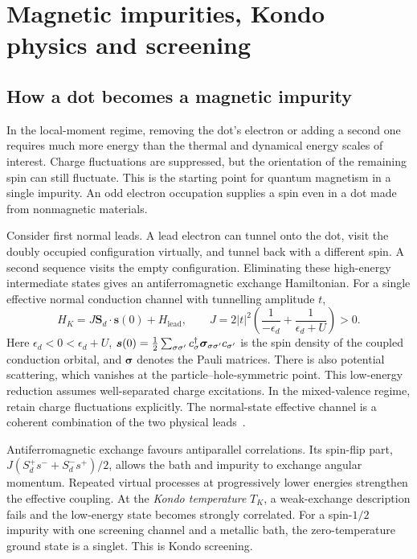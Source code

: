 \chapter{Magnetic impurities, Kondo physics and screening}\label{ch:correlations}

\section{How a dot becomes a magnetic impurity}

In the local-moment regime, removing the dot's electron or adding a second one
requires much more energy than the thermal and dynamical energy scales of interest.
Charge fluctuations are suppressed, but the orientation of the remaining spin
can still fluctuate. This is the starting point for quantum magnetism in a
single impurity. An odd electron occupation supplies a spin even in a dot made
from nonmagnetic materials.

Consider first normal leads. A lead electron can tunnel onto the dot, visit the
doubly occupied configuration virtually, and tunnel back with a different spin.
A second sequence visits the empty configuration. Eliminating these high-energy
intermediate states gives an antiferromagnetic exchange Hamiltonian. For a single
effective normal conduction channel with tunnelling amplitude $t$,
\begin{equation}\label{eq:exchange-picture}
 H_K=J\bm S_d\cdot\bm s(0)+H_{\mathrm{lead}},\qquad
 J=2|t|^2\left(\frac1{-\epsilon_d}+\frac1{\epsilon_d+U}\right)>0.
\end{equation}
Here $\epsilon_d<0<\epsilon_d+U$, $\bm s(0)=
\tfrac12\sum_{\sigma\sigma'}c_\sigma^\dagger\bm\sigma_{\sigma\sigma'}c_{\sigma'}$
is the spin density of the coupled conduction orbital, and $\bm\sigma$ denotes
the Pauli matrices. There is also potential scattering, which vanishes at the
particle--hole-symmetric point. This low-energy reduction assumes well-separated
charge excitations. In the mixed-valence regime, retain charge fluctuations explicitly.
The normal-state effective channel is a coherent combination of the two physical
leads~\cite{hewson1993kondo,bulla2008numerical}.

Antiferromagnetic exchange favours antiparallel correlations. Its spin-flip part,
$J(S_d^+s^-+S_d^-s^+)/2$, allows the bath and impurity to exchange angular
momentum. Repeated virtual processes at progressively lower energies strengthen
the effective coupling. At the \emph{Kondo temperature} $T_K$, a weak-exchange
description fails and the low-energy state becomes strongly correlated. For
a spin-$1/2$ impurity with one screening channel and a metallic bath, the
zero-temperature ground state is a singlet. This is Kondo screening.

